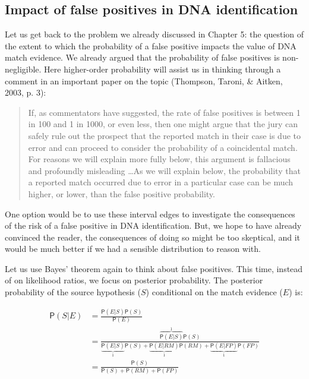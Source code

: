 \documentclass[
  10pt,
  dvipsnames,enabledeprecatedfontcommands]{scrartcl}
\newcommand{\pr}[1]{\mathsf{P}(#1)}
\begin{document}
\hypertarget{impact-of-false-positives-in-dna-identification}{%
\subsection{Impact of false positives in DNA
identification}\label{impact-of-false-positives-in-dna-identification}}

Let us get back to the problem we already discussed in Chapter 5: the
question of the extent to which the probability of a false positive
impacts the value of DNA match evidence. We already argued that the
probability of false positives is non-negligible. Here higher-order
probability will assist us in thinking through a comment in an important
paper on the topic (Thompson, Taroni, \& Aitken, 2003, p. 3):

\begin{quote}
If, as commentators have suggested, the rate of false positives is between 1 in 100 and 1 in 1000, or even less, then one might argue that the jury can safely rule out
the prospect that the reported match in their case is due to error and can proceed to consider the probability of a coincidental match. For reasons we will explain more fully below, this argument is fallacious and profoundly misleading \dots As we will explain below, the probability that a reported match occurred due to error in a particular case can be much higher, or lower, than the false positive probability. 
\end{quote}

One option would be to use these interval edges to investigate the
consequences of the risk of a false positive in DNA identification. But,
we hope to have already convinced the reader, the consequences of doing
so might be too skeptical, and it would be much better if we had a
sensible distribution to reason with.

Let us use Bayes' theorem again to think about false positives. This
time, instead of on likelihood ratios, we focus on posterior
probability. The posterior probability of the source hypothesis (\(S\))
conditional on the match evidence (\(E\)) is:

\begin{align*}
\pr{S \vert E} &   =  \frac{\pr{E\vert S} \pr{S} } {\pr{E}}\\
& = \frac{\overbrace{\pr{E\vert S}}^1 \pr{S}}{\underbrace{\pr{E\vert S}}_1 \pr{S} + \underbrace{\pr{E \vert RM}}_1 \pr{RM} + \underbrace{\pr{E \vert FP}}_1 \pr{FP}} \\ & = \frac{\pr{S}}{\pr{S} + \pr{RM} + \pr{FP}} 
\end{align*}
\end{document}
